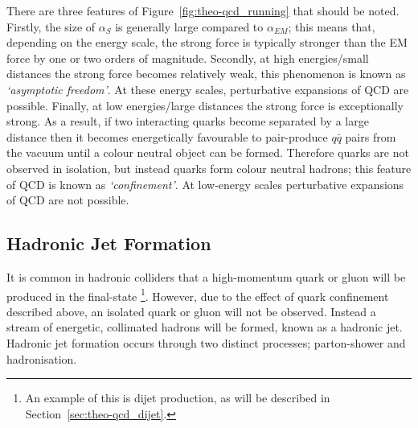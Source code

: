 There are three features of Figure~\ref{fig:theo-qcd_running} that should be noted.
Firstly, the size of $\alpha_S$ is generally large compared to $\alpha_{EM}$;
this means that, depending on the energy scale, the strong force is typically stronger than the EM force by one or two orders of magnitude.
Secondly, at high energies/small distances the strong force becomes relatively weak, this phenomenon is known as
\textit{`asymptotic freedom'}.
At these energy scales, perturbative expansions of QCD are possible.
Finally, at low energies/large distances the strong force is exceptionally strong.
As a result, if two interacting quarks become separated by a large distance then it becomes energetically favourable to
pair-produce $q\bar{q}$ pairs from the vacuum until a colour neutral object can be formed.
Therefore quarks are not observed in isolation, but instead quarks form colour neutral hadrons; this feature of QCD is known as \textit{`confinement'}.
At low-energy scales perturbative expansions of QCD are not possible.

\subsection{Hadronic Jet Formation}
\label{sec:theo-qcd_jets}

It is common in hadronic colliders that a high-momentum quark or gluon will be produced in the final-state
\footnote{An example of this is dijet production, as will be described in Section~\ref{sec:theo-qcd_dijet}.}.
However, due to the effect of quark confinement described above, an isolated quark or gluon will not be observed.
Instead a stream of energetic, collimated hadrons will be formed, known as a hadronic jet.
Hadronic jet formation occurs through two distinct processes; parton-shower and hadronisation.


